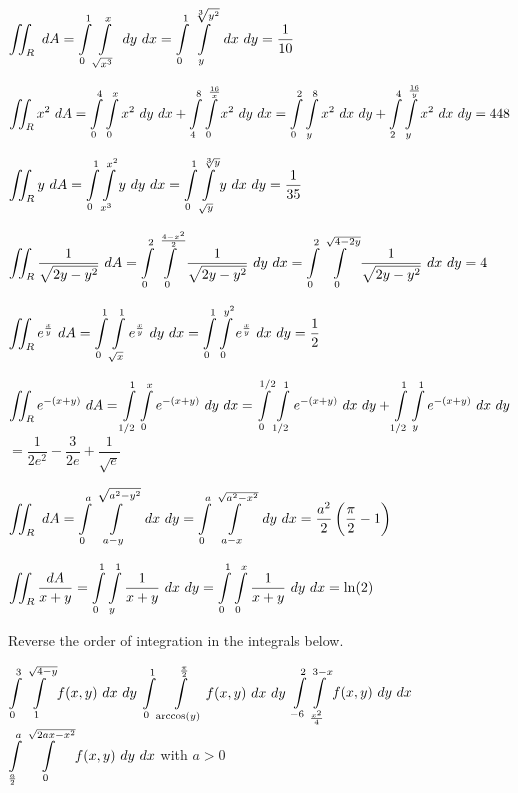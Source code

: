 \begin{Answer}
        
        \Question $\displaystyle \iint_R\ dA = \displaystyle \int\limits_{0}^1\int\limits_{\sqrt{x^3}}^{x} \ dy\ dx = \displaystyle \int\limits_{0}^1\int\limits_{y}^{\sqrt[3]{y^2}} \ dx\ dy  = \dfrac{1}{10}$
      
        \Question $\displaystyle \iint_R x^2 \ dA =  \displaystyle \int\limits_{0}^4\int\limits_{0}^{x} x^2 \ dy\ dx + \displaystyle \int\limits_{4}^8\int\limits_{0}^{\frac{16}{x}} x^2 \ dy\ dx  = \displaystyle \int\limits_{0}^2\int\limits_{y}^{8}x^2  \ dx\ dy +  \displaystyle \int\limits_{2}^4\int\limits_{y}^{\frac{16}{y}}x^2  \ dx\ dy  = 448$ 
      
         \Question $\displaystyle \iint_R y\ dA = \displaystyle \int\limits_{0}^1\int\limits_{x^3}^{x^2} y\ dy\ dx = \displaystyle \int\limits_{0}^1\int\limits_{\sqrt{y}}^{\sqrt[3]{y}} y\ dx\ dy  = \dfrac{1}{35}$ 
      
         
        \Question $\ds \iint_R \dfrac{1}{\sqrt{2y-y^2}} \ dA  = \ds \int\limits_{0}^2\int\limits_{0}^{\frac{4-x^2}{2}} \dfrac{1}{\sqrt{2y-y^2}}\ dy\ dx = \ds \int\limits_{0}^2\int\limits_{0}^{\sqrt{4-2y}} \dfrac{1}{\sqrt{2y-y^2}}\ dx\ dy  = 4 $ 
      
        \Question $\displaystyle \iint_R e^{\frac{x}{y}} \ dA = \displaystyle\int\limits_{0}^1\int\limits_{\sqrt{x}}^1 e^{\frac{x}{y}}\ dy\ dx = \displaystyle\int\limits_{0}^1\int\limits_{0}^{y^2} e^{\frac{x}{y}}\ dx\ dy = \dfrac{1}{2}$
    
        \Question $\ds \iint_R e^{-(x+y)} \ dA = \ds\int\limits_{1/2}^1\int\limits_0^x e^{-(x+y)}\ dy\ dx  = \ds\int\limits_0^{1/2}\int\limits_{1/2}^1 e^{-(x+y)}\ dx\ dy +  \ds\int\limits_{1/2}^1\int\limits_y^1 e^{-(x+y)}\ dx\ dy$ \\[0.2cm]
        $ = \dfrac{1}{2e^2} - \dfrac{3}{2e} + \dfrac{1}{\sqrt{e}}$ 
        
        \Question $\displaystyle \iint_R  \ dA  = \displaystyle\int\limits_0^a\int\limits_{a-y}^{\sqrt{a^2-y^2}}\ dx \ dy = \displaystyle\int\limits_0^a\int\limits_{a-x}^{\sqrt{a^2-x^2}}\ dy \ dx = \dfrac{a^2}{2}\left( \dfrac{\pi}{2} - 1 \right)$ 
        
        \Question $\displaystyle \iint_R  \dfrac{dA}{x+y} = \displaystyle\int\limits_0^1\int\limits_y^1 \dfrac{1}{x+y} \ dx \ dy = \displaystyle\int\limits_0^1\int\limits_0^x \dfrac{1}{x+y} \ dy \ dx = \ln (2)$ 
    
\end{Answer}

\pagebreak
\begin{Exercise} Reverse the order of  integration  in the integrals below.
    \begin{multicols}{2}
         \Question[difficulty = 1] $\displaystyle \int\limits_{0}^3\int\limits_{1}^{\sqrt{4-y}} f(x,y)\ dx\ dy$
         \Question[difficulty = 1] $\ds \int\limits_{0}^1\int\limits_{\arccos(y)}^{\frac{\pi}{2}} f(x,y)\ dx\ dy$
         \Question[difficulty = 2] $\ds \int\limits_{-6}^2\int\limits_{\frac{x^2}{4}}^{3-x} f(x,y)\ dy\ dx$
         \Question[difficulty = 3] $\ds \int\limits_{\frac{a}{2}}^{a}\int\limits_{0}^{\sqrt{2ax-x^2}} f(x,y)\ dy\ dx$ \quad with $a>0$ 
         \EndCurrentQuestion
    \end{multicols}
\end{Exercise}


